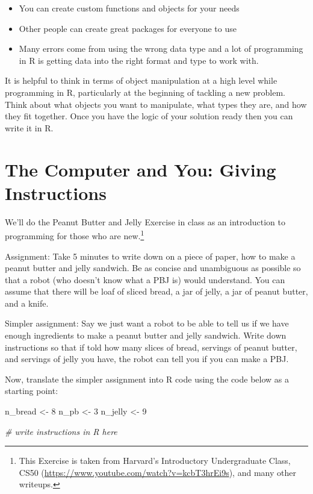 \documentclass[
]{book}
\newenvironment{Shaded}{\begin{snugshade}}{\end{snugshade}}
\newcommand{\CommentTok}[1]{\textcolor[rgb]{0.56,0.35,0.01}{\textit{#1}}}
\newcommand{\DecValTok}[1]{\textcolor[rgb]{0.00,0.00,0.81}{#1}}
\newcommand{\NormalTok}[1]{#1}
\newcommand{\StringTok}[1]{\textcolor[rgb]{0.31,0.60,0.02}{#1}}
\providecommand{\tightlist}{%
  \setlength{\itemsep}{0pt}\setlength{\parskip}{0pt}}
\theoremstyle{definition}
\theoremstyle{definition}
\theoremstyle{definition}
\theoremstyle{remark}
\begin{document}
\begin{itemize}
\tightlist
\item
  You can create custom functions and objects for your needs
\item
  Other people can create great packages for everyone to use
\item
  Many errors come from using the wrong data type and a lot of programming in R is getting data into the right format and type to work with.
\end{itemize}

It is helpful to think in terms of object manipulation at a high level while programming in R, particularly at the beginning of tackling a new problem. Think about what objects you want to manipulate, what types they are, and how they fit together. Once you have the logic of your solution ready then you can write it in R.

\hypertarget{the-computer-and-you-giving-instructions}{%
\section{The Computer and You: Giving Instructions}\label{the-computer-and-you-giving-instructions}}

We'll do the Peanut Butter and Jelly Exercise in class as an introduction to programming for those who are new.\footnote{This Exercise is taken from Harvard's Introductory Undergraduate Class, CS50 (\url{https://www.youtube.com/watch?v=kcbT3hrEi9s}), and many other writeups.}

Assignment: Take 5 minutes to write down on a piece of paper, how to make a peanut butter and jelly sandwich. Be as concise and unambiguous as possible so that a robot (who doesn't know what a PBJ is) would understand. You can assume that there will be loaf of sliced bread, a jar of jelly, a jar of peanut butter, and a knife.

Simpler assignment: Say we just want a robot to be able to tell us if we have enough ingredients to make a peanut butter and jelly sandwich. Write down instructions so that if told how many slices of bread, servings of peanut butter, and servings of jelly you have, the robot can tell you if you can make a PBJ.

Now, translate the simpler assignment into R code using the code below as a starting point:

\begin{Shaded}
\begin{Highlighting}[]
\NormalTok{n\_bread <{-}}\StringTok{ }\DecValTok{8}
\NormalTok{n\_pb <{-}}\StringTok{ }\DecValTok{3}
\NormalTok{n\_jelly <{-}}\StringTok{ }\DecValTok{9}

\CommentTok{\# write instructions in R here}
\end{Highlighting}
\end{Shaded}
\end{document}
